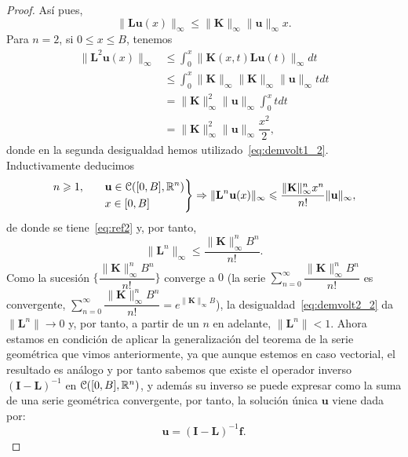 \begin{proof}
	Así pues,
	\begin{equation}\label{eq:demvolt1_2}
		\lVert \textbf{L}\textbf{u}(x)\rVert_\infty \leqslant \lVert \textbf{K} \rVert_\infty \lVert \textbf{u} \rVert_\infty x.
	\end{equation}
	Para $n = 2$, si $0 \leqslant x \leqslant B$, tenemos
	\begin{equation}
		\begin{split}
			\lVert \textbf{L}^2\textbf{u}(x)\rVert_\infty & \leqslant \int_{0}^{x}\lVert \textbf{K}(x,t)\textbf{L}\textbf{u}(t)\rVert_\infty dt \\
			& \leqslant \int_{0}^{x} \lVert \textbf{K} \rVert_\infty \lVert \textbf{K} \rVert_\infty \lVert \textbf{u} \rVert_\infty tdt\\
			& =  \lVert \textbf{K} \rVert_\infty^2 \lVert \textbf{u} \rVert_\infty \int_{0}^{x}tdt \\
			& = \lVert \textbf{K} \rVert_\infty^2 \lVert \textbf{u} \rVert_\infty \dfrac{x^2}{2},
		\end{split}
	\end{equation}
	donde en la segunda desigualdad hemos utilizado~\eqref{eq:demvolt1_2}. Inductivamente deducimos
	\begin{equation}
		\left.\begin{split}
			n \geqslant 1, \qquad & \textbf{u} \in \mathcal{C}([0,B],\mathbb{R}^n)\\
			& x \in [0,B]
		\end{split}\right\rbrace \Rightarrow \lVert \textbf{L}^n\textbf{u}(x)\rVert_\infty \leqslant \dfrac{\lVert \textbf{K} \rVert_\infty^nx^n}{n!}\lVert \textbf{u} \rVert_\infty,
	\end{equation}
	de donde se tiene~\eqref{eq:ref2} y, por tanto,
	\begin{equation}\label{eq:demvolt2_2}
		\lVert \textbf{L}^n \rVert_\infty \leqslant \dfrac{\lVert \textbf{K} \rVert_\infty^nB^n}{n!}.
	\end{equation}
	Como la sucesión $\{\dfrac{\lVert \textbf{K} \rVert_\infty^nB^n}{n!}\}$ converge a $0$ (la serie $\sum_{n=0}^{\infty}\dfrac{\lVert \textbf{K} \rVert_\infty^nB^n}{n!}$ es convergente, $\sum_{n=0}^{\infty}\dfrac{\lVert \textbf{K} \rVert_\infty^nB^n}{n!} = e^{\lVert \textbf{K} \rVert_\infty B}$), la desigualdad~\eqref{eq:demvolt2_2} da $\lVert \textbf{L}^n \rVert \rightarrow 0$ y, por tanto, a partir de un $n$ en adelante, $\lVert \textbf{L}^n \rVert < 1$.
	Ahora estamos en condición de aplicar la generalización del teorema de la serie geométrica que vimos anteriormente, ya que aunque estemos en caso vectorial, el resultado es análogo y por tanto sabemos que existe el operador inverso $(\textbf{I}-\textbf{L})^{-1}$ en $\mathcal{C}([0,B],\mathbb{R}^n)$, y además su inverso se puede expresar como la suma de una serie geométrica convergente, por tanto, la solución única $\textbf{u}$ viene dada por:
	\begin{equation}
		\textbf{u} = (\textbf{I}-\textbf{L})^{-1}\textbf{f}.
	\end{equation}
\end{proof}

\endinput
